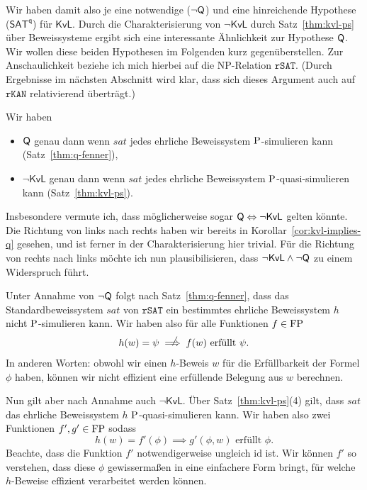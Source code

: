 Wir haben damit also je eine notwendige ($\neg\hQ$) und eine hinreichende Hypothese ($\mathsf{SAT^{q}}$) für $\mathsf{KvL}$. Durch die Charakterisierung von $\neg\mathsf{KvL}$ durch Satz~\ref{thm:kvl-ps} über Beweissysteme ergibt sich eine interessante Ähnlichkeit zur Hypothese $\hQ$. Wir wollen diese beiden Hypothesen im Folgenden kurz gegenüberstellen.
Zur Anschaulichkeit beziehe ich mich hierbei auf die NP-Relation $\mathtt{rSAT}$. (Durch Ergebnisse im nächsten Abschnitt wird klar, dass sich dieses Argument auch auf $\mathtt{rKAN}$ relativierend überträgt.)

Wir haben
\begin{itemize}[midpenalty=10000]
    \item $\hQ$ genau dann wenn $\mathit{sat}$ jedes ehrliche Beweissystem $\P$-simulieren kann (Satz~\ref{thm:q-fenner}),
    \item $\neg\mathsf{KvL}$ genau dann wenn $\mathit{sat}$ jedes ehrliche Beweissystem $\P$-quasi-simulieren kann (Satz~\ref{thm:kvl-ps}).
\end{itemize}

Insbesondere vermute ich, dass möglicherweise sogar $\hQ\Leftrightarrow\neg\mathsf{KvL}$ gelten könnte. Die Richtung von links nach rechts haben wir bereits in Korollar~\ref{cor:kvl-implies-q} gesehen, und ist ferner in der Charakterisierung hier trivial. Für die Richtung von rechts nach links möchte ich nun plausibilisieren, dass $\neg\mathsf{KvL}\land\neg\hQ$ zu einem Widerspruch führt.

Unter Annahme von $\neg\hQ$ folgt nach Satz~\ref{thm:q-fenner}, dass das Standardbeweissystem $\mathit{sat}$ von $\mathtt{rSAT}$ ein bestimmtes ehrliche Beweissystem $h$ nicht $\P$-simulieren kann.
Wir haben also für alle Funktionen $f\in\FP$ 
\begin{equation} h(w)=\psi \rlap{\hspace*{2pt}\raisebox{2.3pt}{$\quad\not$}}\implies  \text{$f(w)$ erfüllt $\psi$}.\label{eq:weak-irreducibility} \end{equation}
In anderen Worten: obwohl wir einen $h$-Beweis $w$ für die Erfüllbarkeit der Formel $\phi$ haben, können wir nicht effizient eine erfüllende Belegung aus $w$ berechnen.

Nun gilt aber nach Annahme auch $\neg\mathsf{KvL}$. Über Satz~\ref{thm:kvl-ps}(4) gilt, dass $\mathit{sat}$ das ehrliche Beweissystem $h$ $\P$-quasi-simulieren kann. Wir haben also zwei Funktionen $f', g'\in\FP$ sodass
\begin{equation}\label{eq:effective-simulation} h(w)=f'(\phi) \implies \text{$g'(\phi, w)$ erfüllt $\phi$}. \end{equation}
Beachte, dass die Funktion $f'$ notwendigerweise ungleich $\mathrm{id}$ ist. Wir können $f'$ so verstehen, dass diese $\phi$ gewissermaßen in eine einfachere Form bringt, für welche $h$-Beweise effizient verarbeitet werden können.

